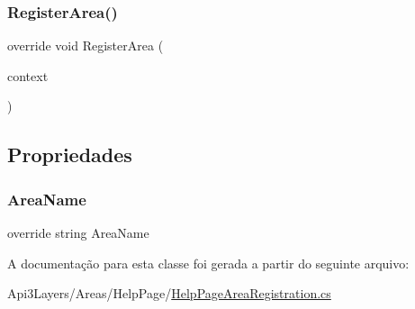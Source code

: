 \subsubsection{\texorpdfstring{Register\+Area()}{RegisterArea()}}
{\footnotesize\ttfamily override void Register\+Area (\begin{DoxyParamCaption}\item[{Area\+Registration\+Context}]{context }\end{DoxyParamCaption})}



\subsection{Propriedades}
\mbox{\label{classApi3Layers_1_1Areas_1_1HelpPage_1_1HelpPageAreaRegistration_acf6f429626f20687e61c64d5d5dd9f6d}} 
\subsubsection{\texorpdfstring{Area\+Name}{AreaName}}
{\footnotesize\ttfamily override string Area\+Name\hspace{0.3cm}{\ttfamily [get]}}



A documentação para esta classe foi gerada a partir do seguinte arquivo\+:\begin{DoxyCompactItemize}
\item 
Api3\+Layers/\+Areas/\+Help\+Page/\hyperlink{HelpPageAreaRegistration_8cs}{Help\+Page\+Area\+Registration.\+cs}\end{DoxyCompactItemize}
